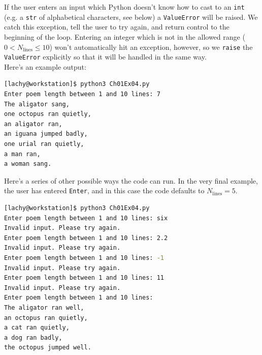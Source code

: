\documentclass{report}
\begin{document}
\indent If the user enters an input which Python doesn't know how to cast to an \verb|int| (e.g. a \verb|str| of alphabetical characters, see below) a \verb|ValueError| will be raised. We catch this exception, tell the user to try again, and return control to the beginning of the loop. Entering an integer which is not in the allowed range ($0<N_{\text{lines}}\leq 10$) won't automatically hit an exception, however, so we \verb|raise| the \verb|ValueError| explicitly so that it will be handled in the same way.\\
\indent Here's an example output:
\begin{lstlisting}[language=bash, style=terminalStyle]
[lachy@workstation]$ python3 Ch01Ex04.py 
Enter poem length between 1 and 10 lines: 7
The aligator sang,
one octopus ran quietly,
an aligator ran,
an iguana jumped badly,
one urial ran quietly,
a man ran,
a woman sang.
\end{lstlisting}
\indent Here's a series of other possible ways the code can run. In the very final example, the user has entered \verb|Enter|, and in this case the code defaults to $N_{\text{lines}}=5$.
\begin{lstlisting}[language=bash, style=terminalStyle]
[lachy@workstation]$ python3 Ch01Ex04.py
Enter poem length between 1 and 10 lines: six
Invalid input. Please try again.
Enter poem length between 1 and 10 lines: 2.2
Invalid input. Please try again.
Enter poem length between 1 and 10 lines: -1
Invalid input. Please try again.
Enter poem length between 1 and 10 lines: 11
Invalid input. Please try again.
Enter poem length between 1 and 10 lines: 
The aligator ran well,
an octopus ran quietly,
a cat ran quietly,
a dog ran badly,
the octopus jumped well.
\end{lstlisting}
\end{document}
